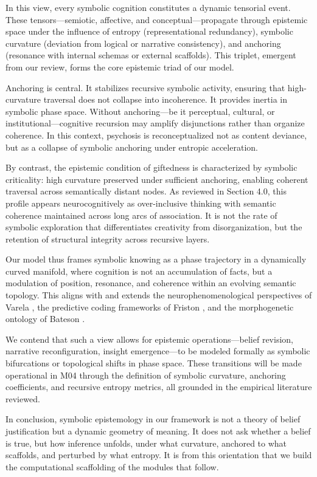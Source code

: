 In this view, every symbolic cognition constitutes a dynamic tensorial event. These tensors—semiotic, affective, and conceptual—propagate through epistemic space under the influence of entropy (representational redundancy), symbolic curvature (deviation from logical or narrative consistency), and anchoring (resonance with internal schemas or external scaffolds). This triplet, emergent from our review, forms the core epistemic triad of our model.

Anchoring is central. It stabilizes recursive symbolic activity, ensuring that high-curvature traversal does not collapse into incoherence. It provides inertia in symbolic phase space. Without anchoring—be it perceptual, cultural, or institutional—cognitive recursion may amplify disjunctions rather than organize coherence. In this context, psychosis is reconceptualized not as content deviance, but as a collapse of symbolic anchoring under entropic acceleration.

By contrast, the epistemic condition of giftedness is characterized by symbolic criticality: high curvature preserved under sufficient anchoring, enabling coherent traversal across semantically distant nodes. As reviewed in Section 4.0, this profile appears neurocognitively as over-inclusive thinking with semantic coherence maintained across long arcs of association. It is not the rate of symbolic exploration that differentiates creativity from disorganization, but the retention of structural integrity across recursive layers.

Our model thus frames symbolic knowing as a phase trajectory in a dynamically curved manifold, where cognition is not an accumulation of facts, but a modulation of position, resonance, and coherence within an evolving semantic topology. This aligns with and extends the neurophenomenological perspectives of Varela \cite{varela1996neurophenomenology}, the predictive coding frameworks of Friston \cite{friston2010free}, and the morphogenetic ontology of Bateson \cite{bateson1979mind}.

We contend that such a view allows for epistemic operations—belief revision, narrative reconfiguration, insight emergence—to be modeled formally as symbolic bifurcations or topological shifts in phase space. These transitions will be made operational in M04 through the definition of symbolic curvature, anchoring coefficients, and recursive entropy metrics, all grounded in the empirical literature reviewed.

In conclusion, symbolic epistemology in our framework is not a theory of belief justification but a dynamic geometry of meaning. It does not ask whether a belief is true, but how inference unfolds, under what curvature, anchored to what scaffolds, and perturbed by what entropy. It is from this orientation that we build the computational scaffolding of the modules that follow.


